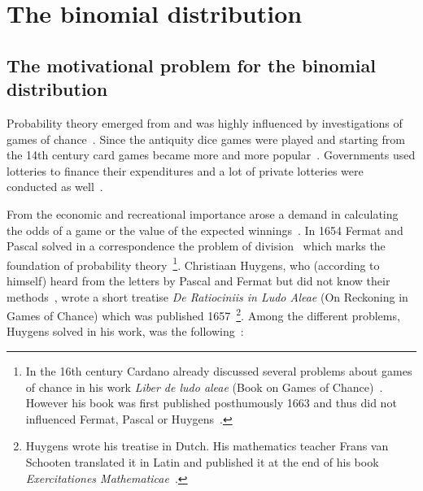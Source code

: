 \chapter{The binomial distribution}

\section{The motivational problem for the binomial distribution}

Probability theory emerged from and was highly influenced by investigations of games of chance~\cite[p. 4]{hald1}. Since the antiquity dice games were played and starting from the 14th century card games became more and more popular~\cite[pp. 33-34]{hald1}. Governments used lotteries to finance their expenditures and a lot of private lotteries were conducted as well~\cite[p. 34]{hald1}.


From the economic and recreational importance arose a demand in calculating the odds of a game or the value of the expected winnings~\cite[p. 34]{hald1}. In 1654 Fermat and Pascal solved in a correspondence the problem of division~\cite[pp. 42-64]{hald1} which marks the foundation of probability theory~\cite[p. 4]{hald1}\footnote{In the 16th century Cardano already discussed several problems about games of chance in his work \emph{Liber de ludo aleae} (Book on Games of Chance)~\cite[pp. 33-41]{hald1}. However his book was first published posthumously 1663 and thus did not influenced Fermat, Pascal or Huygens~\cite[p. vii]{bernoulli}.}. Christiaan Huygens, who (according to himself) heard from the letters by Pascal and Fermat but did not know their methods~\cite[p. 67]{hald1}, wrote a short treatise \emph{De Ratiociniis in Ludo Aleae} (On Reckoning in Games of Chance) which was published 1657~\cite[p. vii]{bernoulli}\footnote{Huygens wrote his treatise in Dutch. His mathematics teacher Frans van Schooten translated it in Latin and published it at the end of his book \emph{Exercitationes Mathematicae}~\cite[pp. 65-68]{hald1}.}. Among the different problems, Huygens solved in his work, was the following~\cite[p. 163]{bernoulli}:

